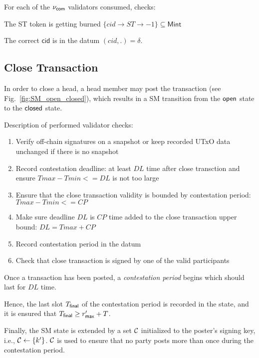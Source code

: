 For each of the $\nu_\mathsf{com}$ validators consumed, checks:
\begin{menumerate}
  \item The ST token is getting burned $\{cid \rightarrow ST \rightarrow -1\} \subseteq \mathsf{Mint}$
  \item The correct $\mathsf{cid}$ is in the datum $(cid,.) = \delta$.
\end{menumerate}

\subsection{Close Transaction} 

In order to close a head, a head
member may post the \mtxClose{} transaction (see
Fig.~\ref{fig:SM_open_closed}), which results in a SM transition
from the $\mathsf{open}$ state to the $\mathsf{closed}$ state.\newline

Description of performed validator checks:

\begin{enumerate}
  \item Verify off-chain signatures on a snapshot or keep recorded UTxO data unchanged if there is no snapshot 
  \item Record contestation deadline: at least $DL$ time after close transction and ensure $Tmax - Tmin <= DL$ is not too large
  \item Ensure that the close transaction validity is bounded by contestation period: $Tmax - Tmin <= CP$  
  \item Make sure deadline $DL$ is $CP$ time added to the close transaction upper bound: $DL = Tmax + CP$
  \item Record contestation period in the datum 
  \item Check that close transaction is signed by one of the valid participants
\end{enumerate}

Once a \mtxClose{} transaction has been posted, a \emph{contestation period}
begins which should last for $DL$ time.

Hence, the last slot
$T_{\mathsf{final}}$ of the contestation period is recorded in the state, and it
is ensured that $T_{\mathsf{final}} \geq r_{\mathsf{max}}' + T$.

Finally, the SM state is extended by a set $\mathcal C$
initialized to the poster's signing key, i.e.,
$\mathcal C \gets \{k'\}$.   $\mathcal C$ is used to ensure that no party
posts more than once during the contestation period.


